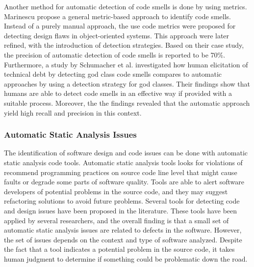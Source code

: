 Another method for automatic detection of code smells is done by using metrics. Marinescu\cite{marinescu2001detecting} propose a general metric-based approach to identify code smells. Instead of a purely manual approach, the use code metrics were proposed for detecting design flaws in object-oriented systems. This approach were later refined, with the introduction of detection strategies\cite{marinescu2004detection}. Based on their case study, the precision of automatic detection of code smells is reported to be 70\%. Furthermore, a study by Schumacher et al.\cite{schumacher2010building} investigated how human elicitation of technical debt by detecting god class code smells compares to automatic approaches by using a detection strategy for god classes. Their findings show that humans are able to detect code smells in an effective way if provided with a suitable process. Moreover, the the findings revealed that the automatic approach yield high recall and precision in this context. 



\subsubsection{Automatic Static Analysis Issues}
The identification of software design and code issues can be done with automatic static analysis code tools. Automatic static analysis tools looks for violations of recommend programming practices on source code line level that might cause faults or degrade some parts of software quality\cite{zazworka2014comparing}. Tools are able to alert software developers of potential problems in the source code, and they may suggest refactoring solutions to avoid future problems. Several tools for detecting code and design issues have been proposed in the literature\cite{rutar2004comparison}. These tools have been applied by several researchers\cite{zazworka2014comparing,copeland2005pmd,codabux2016technical,rutar2004comparison}, and the overall finding is that a small set of automatic static analysis issues are related to defects in the software. However, the set of issues depends on the context and type of software analyzed. Despite the fact that a tool indicates a potential problem in the source code, it takes human judgment to determine if something could be problematic down the road. 



